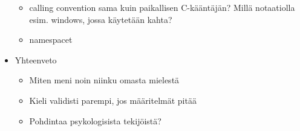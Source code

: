 \begin{itemize}
\begin{itemize}
            \item calling convention sama kuin paikallisen C-kääntäjän? Millä notaatiolla esim. windows, jossa käytetään kahta?
            \item namespacet
        \end{itemize}
    \item Yhteenveto
        \begin{itemize}
            \item Miten meni noin niinku omasta mielestä
            \item Kieli validisti parempi, jos määritelmät pitää
            \item Pohdintaa psykologisista tekijöistä?
        \end{itemize}
\end{itemize}
